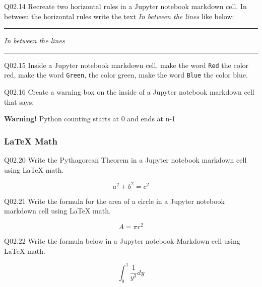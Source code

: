 \documentclass{book}
\newenvironment{problems}{}{}  %
\newcommand{\passthrough}[1]{#1}
\begin{document}
\begin{problems}
Q02.14 Recreate two horizontal rules in a Jupyter notebook markdown
cell. In between the horizontal rules write the text \emph{In between
the lines} like below:

\begin{center}\rule{0.5\linewidth}{\linethickness}\end{center}

\emph{In between the lines}

\begin{center}\rule{0.5\linewidth}{\linethickness}\end{center}

Q02.15 Inside a Jupyter notebook markdown cell, make the word
\passthrough{\lstinline!Red!} the color red, make the word
\passthrough{\lstinline!Green!}, the color green, make the word
\passthrough{\lstinline!Blue!} the color blue.

Q02.16 Create a warning box on the inside of a Jupyter notebook markdown
cell that says:

\textbf{Warning!} Python counting starts at 0 and ends at n-1
        \end{problems}

    




    
        \hypertarget{latex-math}{%
\subsubsection{LaTeX Math}\label{latex-math}}

Q02.20 Write the Pythagorean Theorem in a Jupyter notebook markdown cell
using LaTeX math.

\[ a^2 + b^2 = c^2 \]

Q02.21 Write the formula for the area of a circle in a Jupyter notebook
markdown cell using LaTeX math.

\[ A = \pi r^2 \]

Q02.22 Write the formula below in a Jupyter notebook Markdown cell using
LaTeX math.

\[ \int_{0}^{1} \frac{1}{y^3} dy \]
    
\end{document}
